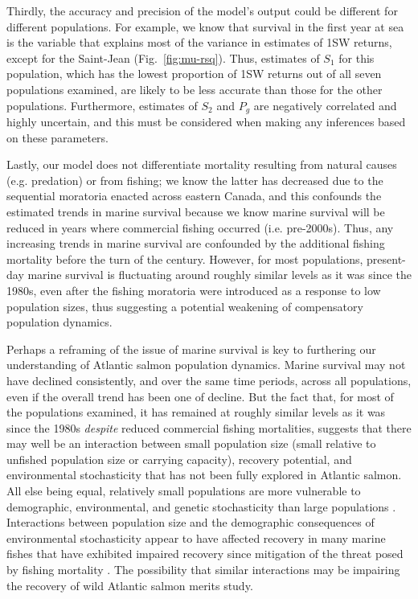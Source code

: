 \documentclass[12pt]{article}
\newcommand{\So}{$S_{1}$\xspace}
\newcommand{\St}{$S_{2}$\xspace}
\newcommand{\Pg}{$P_g$\xspace}
\begin{document}
Thirdly, the accuracy and precision of the model's output could be different
for different populations. For example, we know that survival in the first
year at sea is the variable that explains most of the variance in estimates of 1SW returns, except for
the Saint-Jean (Fig.~\ref{fig:mu-rsq}). Thus, estimates of \So for this
population, which has the lowest proportion of 1SW returns out of all seven
populations examined, are likely to be less accurate than those for the other
populations.
Furthermore, estimates of \St and \Pg are negatively correlated and highly uncertain,
and this must be considered when making any inferences based on these parameters.

Lastly, our model does not differentiate mortality resulting from natural
causes (e.g. predation) or from fishing; we know the latter has decreased
due to the sequential moratoria enacted across eastern Canada, and this
confounds the estimated trends in marine survival because we know marine survival
will be reduced in years where commercial fishing occurred (i.e. pre-2000s).
Thus, any increasing trends in marine survival are confounded by the additional 
fishing mortality before the turn of the century.
However, for most populations, present-day marine survival is fluctuating around roughly 
similar levels as it was since the 1980s, even after the fishing moratoria 
were introduced as a response to low population sizes, thus
suggesting a potential weakening of compensatory population dynamics.

Perhaps a reframing of the issue of marine survival is key to furthering our
understanding of Atlantic salmon population dynamics. Marine survival may not
have declined consistently, and over the same time periods, across all
populations, even if the overall trend has been one of decline. 
But the fact that, for most of the populations examined, it has remained at roughly 
similar levels as it was since the 1980s \emph{despite} reduced commercial 
fishing mortalities, suggests
that there may well be an interaction between small population size (small
relative to unfished population size or carrying capacity), recovery
potential, and environmental stochasticity that has not been fully explored in
Atlantic salmon. 
All else being equal, relatively small populations are more vulnerable to
demographic, environmental, and genetic stochasticity than large populations
\citep{Lande1993, Hutchings2015}. Interactions between population size and the
demographic consequences of environmental stochasticity appear to have
affected recovery in many marine fishes that have exhibited impaired recovery
since mitigation of the threat posed by fishing mortality
\citep{Hutchings2017, Hutchings2020}. The possibility that similar
interactions may be impairing the recovery of wild Atlantic salmon merits
study.
\end{document}
